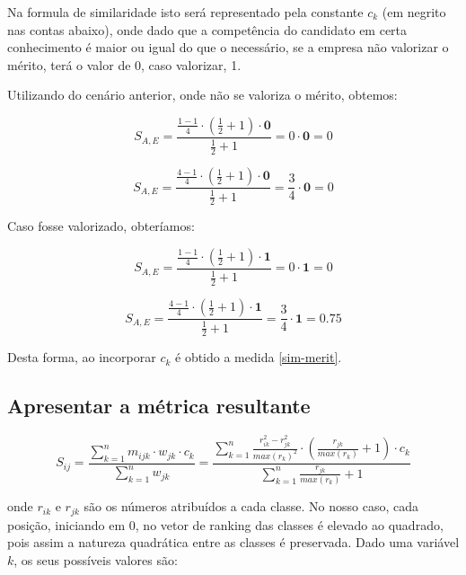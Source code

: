 \documentclass[preprint,12pt]{elsarticle}
\begin{document}
\begin{itemize}
    Na formula de similaridade isto será representado pela constante $c_{k}$ (em negrito nas contas abaixo), onde dado que a competência do candidato em certa conhecimento é maior ou igual do que o necessário, se a empresa não valorizar o mérito, terá o valor de 0, caso valorizar, 1.
    
    Utilizando do cenário anterior, onde não se valoriza o mérito, obtemos:
    
    $$ S_{A,E} = \frac{\tfrac{1 - 1}{4} \cdot (\tfrac{1}{2} + 1) \cdot \textbf{0}}
                      {\tfrac{1}{2} + 1}
               = 0 \cdot \textbf{0} = 0 $$
    
    $$ S_{A,E} = \frac{\tfrac{4 - 1}{4} \cdot (\tfrac{1}{2} + 1) \cdot \textbf{0}}
                      {\tfrac{1}{2} + 1}
               = \frac{3}{4} \cdot \textbf{0} = 0 $$
    
    Caso fosse valorizado, obteríamos:
    
    $$ S_{A,E} = \frac{\tfrac{1 - 1}{4} \cdot (\tfrac{1}{2} + 1) \cdot \textbf{1}}
                      {\tfrac{1}{2} + 1}
               = 0 \cdot \textbf{1} = 0 $$
    
    $$ S_{A,E} = \frac{\tfrac{4 - 1}{4} \cdot (\tfrac{1}{2} + 1) \cdot \textbf{1}}
                      {\tfrac{1}{2} + 1}
               = \frac{3}{4} \cdot \textbf{1} = 0.75 $$
               
    Desta forma, ao incorporar $c_{k}$ é obtido a medida \ref{sim-merit}.
\end{itemize}


\subsection{Apresentar a métrica resultante}

\begin{equation}
\label{sim-merit}
S_{ij} =  \frac{\sum_{k=1}^n m_{ijk} \cdot w_{jk} \cdot c_k}
               {\sum_{k=1}^n w_{jk}} =
          \frac{\sum_{k=1}^n \frac{r_{ik}^2 - r_{jk}^2}{max(r_k)^2} \cdot (\frac{r_{jk}}{max(r_k)} + 1) \cdot c_{k}}
               {\sum_{k=1}^n {\frac{r_{jk}}{max(r_k)} + 1}}
\end{equation}

onde $r_{ik}$ e $r_{jk}$ são os números atribuídos a cada classe. No nosso caso, cada posição, iniciando em 0, no vetor de ranking das classes é elevado ao quadrado, pois assim a natureza quadrática entre as classes é preservada. Dado uma variável $k$, os seus possíveis valores são:
\end{document}
